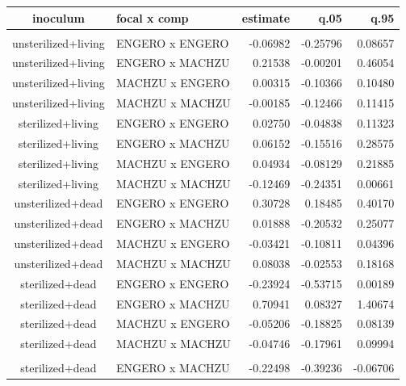 \begin{table}[t]
\fontsize{12.0pt}{14.4pt}\selectfont
\begin{tabular*}{\linewidth}{@{\extracolsep{\fill}}clrrr}
\toprule
inoculum & focal x comp & estimate & q.05 & q.95 \\ 
\midrule\addlinespace[2.5pt]
\multicolumn{5}{l}{1st order} \\[2.5pt] 
\midrule\addlinespace[2.5pt]
unsterilized+living & ENGERO x ENGERO & -0.06982 & -0.25796 & 0.08657 \\ 
unsterilized+living & ENGERO x MACHZU & 0.21538 & -0.00201 & 0.46054 \\ 
unsterilized+living & MACHZU x ENGERO & 0.00315 & -0.10366 & 0.10480 \\ 
unsterilized+living & MACHZU x MACHZU & -0.00185 & -0.12466 & 0.11415 \\ 
sterilized+living & ENGERO x ENGERO & 0.02750 & -0.04838 & 0.11323 \\ 
sterilized+living & ENGERO x MACHZU & 0.06152 & -0.15516 & 0.28575 \\ 
sterilized+living & MACHZU x ENGERO & 0.04934 & -0.08129 & 0.21885 \\ 
sterilized+living & MACHZU x MACHZU & -0.12469 & -0.24351 & 0.00661 \\ 
unsterilized+dead & ENGERO x ENGERO & 0.30728 & 0.18485 & 0.40170 \\ 
unsterilized+dead & ENGERO x MACHZU & 0.01888 & -0.20532 & 0.25077 \\ 
unsterilized+dead & MACHZU x ENGERO & -0.03421 & -0.10811 & 0.04396 \\ 
unsterilized+dead & MACHZU x MACHZU & 0.08038 & -0.02553 & 0.18168 \\ 
sterilized+dead & ENGERO x ENGERO & -0.23924 & -0.53715 & 0.00189 \\ 
sterilized+dead & ENGERO x MACHZU & 0.70941 & 0.08327 & 1.40674 \\ 
sterilized+dead & MACHZU x ENGERO & -0.05206 & -0.18825 & 0.08139 \\ 
sterilized+dead & MACHZU x MACHZU & -0.04746 & -0.17961 & 0.09994 \\ 
\midrule\addlinespace[2.5pt]
\multicolumn{5}{l}{2nd order} \\[2.5pt] 
\midrule\addlinespace[2.5pt]
sterilized+dead & ENGERO x MACHZU & -0.22498 & -0.39236 & -0.06706 \\ 
\bottomrule
\end{tabular*}
\end{table}

